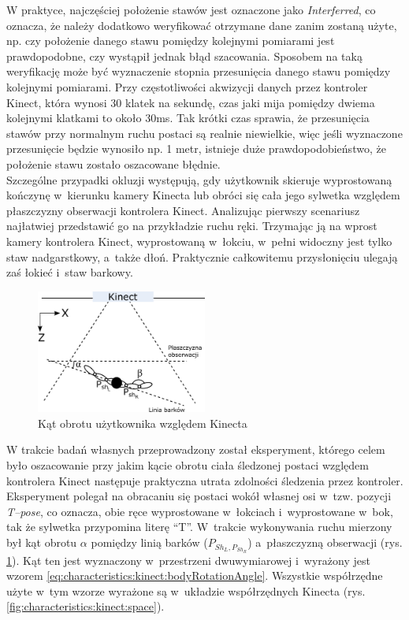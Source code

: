 W praktyce, najczęściej położenie stawów jest oznaczone jako \emph{Interferred}, co oznacza, że należy dodatkowo weryfikować otrzymane dane zanim zostaną użyte, np. czy położenie danego stawu pomiędzy kolejnymi pomiarami jest prawdopodobne, czy wystąpił jednak błąd szacowania. Sposobem na taką weryfikację może być wyznaczenie stopnia przesunięcia danego stawu pomiędzy kolejnymi pomiarami. Przy częstotliwości akwizycji danych przez kontroler Kinect, która wynosi 30 klatek na sekundę, czas jaki mija pomiędzy dwiema kolejnymi klatkami to około 30ms. Tak krótki czas sprawia, że przesunięcia stawów przy normalnym ruchu postaci są realnie niewielkie, więc jeśli wyznaczone przesunięcie będzie wynosiło np. 1 metr, istnieje duże prawdopodobieństwo, że położenie stawu zostało oszacowane błędnie.\\
		
Szczególne przypadki okluzji występują, gdy użytkownik skieruje wyprostowaną kończynę w~kierunku kamery Kinecta lub obróci się cała jego sylwetka względem płaszczyzny obserwacji kontrolera Kinect. Analizując pierwszy scenariusz najłatwiej przedstawić go na przykładzie ruchu ręki. Trzymając ją na wprost kamery kontrolera Kinect, wyprostowaną w~łokciu, w~pełni widoczny jest tylko staw nadgarstkowy, a~także dłoń. Praktycznie całkowitemu przysłonięciu ulegają zaś łokieć i~staw barkowy. 
		
\begin{figure}[!htb]
	\centering
	\includegraphics[width=0.5\textwidth]{images/kinectAngle.png}
	\caption{Kąt obrotu użytkownika względem Kinecta}
	\label{fig:characteristics:kinect:bodyRotationAngle}
\end{figure}
		
W trakcie badań własnych przeprowadzony został eksperyment, którego celem było oszacowanie przy jakim kącie obrotu ciała śledzonej postaci względem kontrolera Kinect następuje praktyczna utrata zdolności śledzenia przez kontroler. Eksperyment polegał na obracaniu się postaci wokół własnej osi w~tzw. pozycji \emph{T--pose}, co oznacza, obie ręce wyprostowane w~łokciach i~wyprostowane w~bok, tak że sylwetka przypomina literę "`T"'. W~trakcie wykonywania ruchu mierzony był kąt obrotu $\alpha$ pomiędzy linią barków ($P_{{Sh}_L, P_{{Sh}_R}}$) a~płaszczyzną obserwacji (rys. \ref{fig:characteristics:kinect:bodyRotationAngle}). Kąt ten jest wyznaczony w~przestrzeni dwuwymiarowej i~wyrażony jest wzorem \eqref{eq:characteristics:kinect:bodyRotationAngle}. Wszystkie współrzędne użyte w~tym wzorze wyrażone są w~układzie współrzędnych Kinecta (rys. \ref{fig:characteristics:kinect:space}).
	
